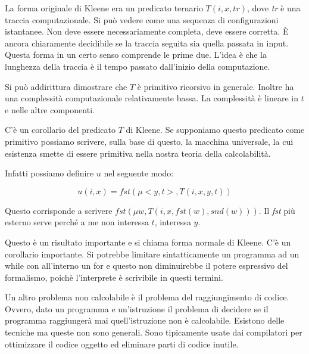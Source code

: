 La forma originale di Kleene era un predicato ternario $T(i,x,\textit{tr})$, dove \textit{tr} è una
traccia computazionale. Si può vedere come una sequenza di configurazioni istantanee. Non deve
essere necessariamente completa, deve essere corretta. È ancora chiaramente decidibile se la traccia
seguita sia quella passata in input. Questa forma in un certo senso comprende le prime due. L'idea è
che la lunghezza della traccia è il tempo passato dall'inizio della computazione.

Si può addirittura dimostrare che $T$ è primitivo ricorsivo in generale. Inoltre ha una complessità
computazionale relativamente bassa. La complessità è lineare in $t$ e nelle altre componenti.

C'è un corollario del predicato $T$ di Kleene. Se supponiamo questo predicato come primitivo
possiamo scrivere, sulla base di questo, la macchina universale, la cui esistenza smette di essere
primitiva nella nostra teoria della calcolabilità.

Infatti possiamo definire $u$ nel seguente modo:

\begin{equation*}
    u(i,x) = \textit{fst}(\mu <y,t>, T(i,x,y,t))
\end{equation*}

Questo corrisponde a scrivere $\textit{fst}(\mu w, T(i,x,\textit{fst}(w),\textit{snd}(w)))$. Il
\textit{fst} più esterno serve perché a me non interessa $t$, interessa $y$.

Questo è un risultato importante e si chiama forma normale di Kleene. C'è un corollario
importante. Si potrebbe limitare sintatticamente un programma ad un while con all'interno un for e
questo non diminuirebbe il potere espressivo del formalismo, poichè l'interprete è scrivibile in
questi termini.

Un altro problema non calcolabile è il problema del raggiungimento di codice. Ovvero, dato un
programma e un'istruzione il problema di decidere se il programma raggiungerà mai quell'istruzione
non è calcolabile. Esistono delle tecniche ma queste non sono generali. Sono tipicamente usate dai
compilatori per ottimizzare il codice oggetto ed eliminare parti di codice inutile.
